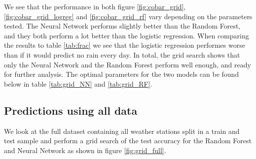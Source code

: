 \documentclass[11pt]{article}
\begin{document}
We see that the performance in both figure \ref{fig:cobar_grid}, \ref{fig:cobar_grid_logreg} and \ref{fig:cobar_grid_rf} vary depending on the parameters tested. The Neural Network performs slightly better than the Random Forest, and they both perform a lot better than the logistic regression. When comparing the results to table \ref{tab:frac} we see that the logistic regression performes worse than if it would predict no rain every day. In total, the grid search shows that only the Neural Network and the Random Forest perform well enough, and ready for further analysis.  The optimal parameters for the two models can be found below in table \ref{tab:grid_NN} and \ref{tab:grid_RF}.
\subsection{Predictions using all data}
We look at the full dataset containing all weather stations split in a train and test sample and perform a grid search of the test accuracy for the Random Forest and Neural Network as shown in figure \ref{fig:grid_full}.
\end{document}

